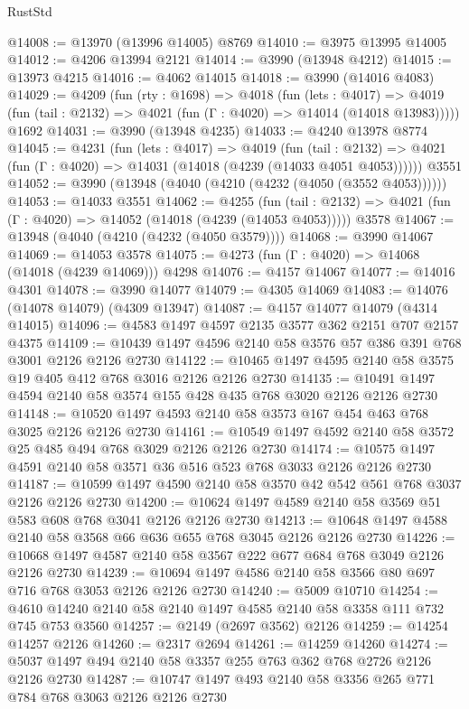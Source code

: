\begin{lexlean}{RustStd}
\begin{coremodule}
{\begin{coremodule}
{{{{{{{{{{{{{{{{@14008 := @13970 (@13996 @14005) @8769
@14010 := @3975 @13995 @14005
@14012 := @4206 @13994 @2121
@14014 := @3990 (@13948 @4212)
@14015 := @13973 @4215
@14016 := @4062 @14015
@14018 := @3990 (@14016 @4083)
@14029 := @4209
    (fun (rty : @1698) =>
    @4018
      (fun (lets : @4017) =>
      @4019 (fun (tail : @2132) => @4021 (fun (Γ : @4020) => @14014 (@14018 @13983)))))
    @1692
@14031 := @3990 (@13948 @4235)
@14033 := @4240 @13978 @8774
@14045 := @4231
    (fun (lets : @4017) =>
    @4019
      (fun (tail : @2132) =>
      @4021 (fun (Γ : @4020) => @14031 (@14018 (@4239 (@14033 @4051 @4053))))))
    @3551
@14052 := @3990 (@13948 (@4040 (@4210 (@4232 (@4050 (@3552 @4053))))))
@14053 := @14033 @3551
@14062 := @4255
    (fun (tail : @2132) => @4021 (fun (Γ : @4020) => @14052 (@14018 (@4239 (@14053 @4053)))))
    @3578
@14067 := @13948 (@4040 (@4210 (@4232 (@4050 @3579))))
@14068 := @3990 @14067
@14069 := @14053 @3578
@14075 := @4273 (fun (Γ : @4020) => @14068 (@14018 (@4239 @14069))) @4298
@14076 := @4157 @14067
@14077 := @14016 @4301
@14078 := @3990 @14077
@14079 := @4305 @14069
@14083 := @14076 (@14078 @14079) (@4309 @13947)
@14087 := @4157 @14077 @14079 (@4314 @14015)
@14096 := @4583 @1497 @4597 @2135 @3577 @362 @2151 @707 @2157 @4375
@14109 := @10439 @1497 @4596 @2140 @58 @3576 @57 @386 @391 @768 @3001 @2126 @2126 @2730
@14122 := @10465 @1497 @4595 @2140 @58 @3575 @19 @405 @412 @768 @3016 @2126 @2126 @2730
@14135 := @10491 @1497 @4594 @2140 @58 @3574 @155 @428 @435 @768 @3020 @2126 @2126 @2730
@14148 := @10520 @1497 @4593 @2140 @58 @3573 @167 @454 @463 @768 @3025 @2126 @2126 @2730
@14161 := @10549 @1497 @4592 @2140 @58 @3572 @25 @485 @494 @768 @3029 @2126 @2126 @2730
@14174 := @10575 @1497 @4591 @2140 @58 @3571 @36 @516 @523 @768 @3033 @2126 @2126 @2730
@14187 := @10599 @1497 @4590 @2140 @58 @3570 @42 @542 @561 @768 @3037 @2126 @2126 @2730
@14200 := @10624 @1497 @4589 @2140 @58 @3569 @51 @583 @608 @768 @3041 @2126 @2126 @2730
@14213 := @10648 @1497 @4588 @2140 @58 @3568 @66 @636 @655 @768 @3045 @2126 @2126 @2730
@14226 := @10668 @1497 @4587 @2140 @58 @3567 @222 @677 @684 @768 @3049 @2126 @2126 @2730
@14239 := @10694 @1497 @4586 @2140 @58 @3566 @80 @697 @716 @768 @3053 @2126 @2126 @2730
@14240 := @5009 @10710
@14254 := @4610 @14240 @2140 @58 @2140 @1497 @4585 @2140 @58 @3358 @111 @732 @745 @753 @3560
@14257 := @2149 (@2697 @3562) @2126
@14259 := @14254 @14257 @2126
@14260 := @2317 @2694
@14261 := @14259 @14260
@14274 := @5037 @1497 @494 @2140 @58 @3357 @255 @763 @362 @768 @2726 @2126 @2126 @2730
@14287 := @10747 @1497 @493 @2140 @58 @3356 @265 @771 @784 @768 @3063 @2126 @2126 @2730
}}}}}}}}}}}}}}}}
\end{coremodule}}
\end{coremodule}
\end{lexlean}
